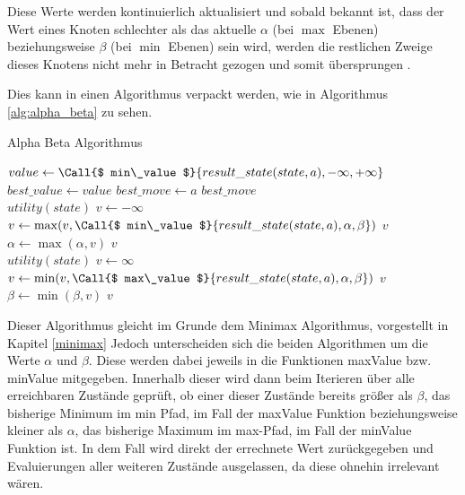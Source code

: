 Diese Werte werden kontinuierlich aktualisiert und sobald bekannt ist, dass der Wert eines Knoten schlechter als das aktuelle $\alpha$ (bei $\max$ Ebenen) beziehungsweise $\beta$ (bei $\min$ Ebenen) sein wird, werden die restlichen Zweige dieses Knotens nicht mehr in Betracht gezogen und somit übersprungen \cite{Russell2010}.

Dies kann in einen Algorithmus verpackt werden, wie in Algorithmus \ref{alg:alpha_beta} zu sehen.

\begin{algorithm}[p]
\caption{Alpha Beta Algorithmus \cite{Russell2010}}
\label{alg:alpha_beta}
\begin{algorithmic}
		\State $ value  \gets \Call{$ min\_value $}{ result\_state(state, a) , -\infty, +\infty}$
			\State $ best\_value  \gets  value $
			\State $ best\_move  \gets  a $
		\EndIf
	\EndFor
	\State \Return $ best\_move $
\EndFunction
\\
	 \State \Return $ utility(state) $ \EndIf
	\State $v \gets -\infty$
		\State $ v  \gets \max( v , \Call{$ min\_value $}{ result\_state(state, a) , \alpha, \beta})$
		 \State \Return $ v $ \EndIf
		\State $\alpha \gets \max(\alpha,  v )$
	\EndFor
	\State \Return $ v $
\EndFunction
\\
	 \State \Return $ utility(state) $ \EndIf
	\State $ v  \gets \infty$
		\State $ v  \gets \min( v , \Call{$ max\_value $}{ result\_state(state, a) , \alpha, \beta})$
		 \State \Return $v$ \EndIf
		\State $\beta \gets \min(\beta, v)$
	\EndFor
	\State \Return $v$
\EndFunction
\end{algorithmic}
\end{algorithm}

Dieser Algorithmus gleicht im Grunde dem Minimax Algorithmus, vorgestellt in Kapitel \ref{minimax} Jedoch unterscheiden sich die beiden Algorithmen um die Werte $\alpha$ und $\beta$. Diese werden dabei jeweils in die Funktionen maxValue bzw. minValue mitgegeben. Innerhalb dieser wird dann beim Iterieren über alle erreichbaren Zustände geprüft, ob einer dieser Zustände bereits größer als $\beta$, das bisherige Minimum im min Pfad, im Fall der maxValue Funktion beziehungsweise kleiner als $\alpha$, das bisherige Maximum im max-Pfad, im Fall der minValue Funktion ist. In dem Fall wird direkt der errechnete Wert zurückgegeben und Evaluierungen aller weiteren Zustände ausgelassen, da diese ohnehin irrelevant wären.

